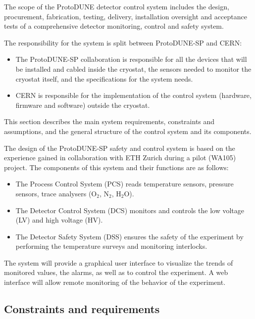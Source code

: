 The scope of the ProtoDUNE detector control system includes the design, procurement, fabrication, testing,
delivery, installation oversight and acceptance tests of a comprehensive detector monitoring, control and safety system.

The responsibility for the system is split between ProtoDUNE-SP and CERN: 
\begin{itemize}
\item	The ProtoDUNE-SP collaboration is responsible for all the devices that will be installed and cabled inside 
the cryostat, the sensors needed to monitor the cryostat itself, and the specifications for the system needs.
\item	CERN is responsible for the implementation of the control system (hardware, firmware and software) outside the cryostat.
\end{itemize}

This section describes the main system requirements, %
constraints and assumptions,  %
and the general structure of 
the control system and its components. %

The design of the ProtoDUNE-SP safety and control system is based on the experience gained in collaboration with ETH Zurich during a pilot (WA105) project. The components of this system and their functions are as follows:
\begin{itemize}
\item	The Process Control System (PCS) reads temperature sensors, pressure sensors, trace analysers (O$_2$, N$_2$, H$_2$O).
\item	The Detector Control System (DCS) monitors and controls the low voltage (LV) and high voltage (HV).
\item	The Detector Safety System (DSS) ensures the safety of the experiment by performing the temperature surveys and monitoring interlocks.
\end{itemize}
The system will provide a graphical user interface to visualize the trends of monitored values, the alarms, as well as to control the experiment. A web interface will allow remote monitoring of the behavior of the experiment.

\subsection{Constraints and requirements}

